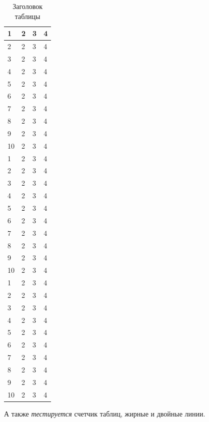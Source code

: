 \documentclass[a4paper,14pt]{extarticle}
\begin{document}
\begin{center}
    \begin{longtable}{|p{2cm}|p{3cm}|p{7cm}|p{3cm}|}
    \caption{Заголовок таблицы}\\
    \hline
    1 & 2 & 3 & 4\\ 
    \hline 
    2 & 2 & 3 & 4\\
    \hline
    3 & 2 & 3 & 4\\
    \hline
    4 & 2 & 3 & 4\\
    \hline
    5 & 2 & 3 & 4\\
    \hline
    6 & 2 & 3 & 4\\
    \hline
    7 & 2 & 3 & 4\\
    \hline
    8 & 2 & 3 & 4\\
    \hline
    9 & 2 & 3 & 4\\
    \hline
    10 & 2 & 3 & 4\\
    \hline
    1 & 2 & 3 & 4\\ 
    \hline 
    2 & 2 & 3 & 4\\
    \hline
    3 & 2 & 3 & 4\\
    \hline
    4 & 2 & 3 & 4\\
    \hline
    5 & 2 & 3 & 4\\
    \hline
    6 & 2 & 3 & 4\\
    \hline
    7 & 2 & 3 & 4\\
    \hline
    8 & 2 & 3 & 4\\
    \hline
    9 & 2 & 3 & 4\\
    \hline
    10 & 2 & 3 & 4\\
    \hline
    1 & 2 & 3 & 4\\ 
    \hline 
    2 & 2 & 3 & 4\\
    \hline
    3 & 2 & 3 & 4\\
    \hline
    4 & 2 & 3 & 4\\
    \hline
    5 & 2 & 3 & 4\\
    \hline
    6 & 2 & 3 & 4\\
    \hline
    7 & 2 & 3 & 4\\
    \hline
    8 & 2 & 3 & 4\\
    \hline
    9 & 2 & 3 & 4\\
    \hline
    10 & 2 & 3 & 4\\
    \hline
    
    
    \end{longtable}
\end{center}


А также \textit{тестируется} счетчик таблиц, жирные и двойные линии.
\end{document}

